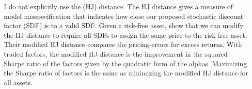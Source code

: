 I do not explicitly use the \textcite{hansen1997assessing} (HJ) distance. The HJ distance
gives a measure of model misspecification that indicates how close our proposed stochastic
discount factor (SDF) is to a valid SDF. Given a risk-free asset, \textcite{kan2008model}
show that we can modify the HJ distance to require all SDFs to assign the same price to
the risk-free asset. Their modified HJ distance compares the pricing-errors for excess
returns. With traded factors, the modified HJ distance is the improvement in the squared
Sharpe ratio of the factors given by the quadratic form of the alphas. Maximizing the
Sharpe ratio of factors is the same as minimizing the modified HJ distance for all assets.

